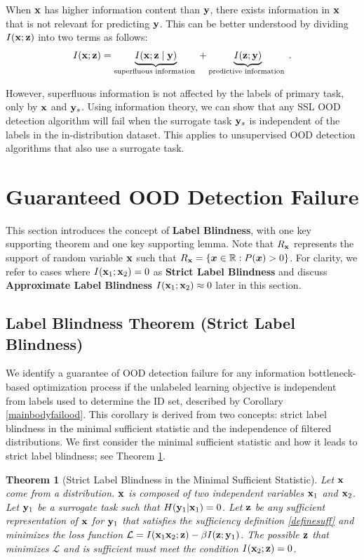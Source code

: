 \documentclass[11pt, oneside]{book}
\theoremstyle{plain}
\newtheorem{theorem}{Theorem}[section]
\theoremstyle{definition}
\theoremstyle{remark}
\begin{document}
When ${\mathbf{x}}$ has higher information content than ${\mathbf{y}}$, there exists information in ${\mathbf{x}}$ that is not relevant for predicting ${\mathbf{y}}$. This can be better understood by dividing $I({\mathbf{x}};{\mathbf{z}})$ into two terms \citep{federici2020learning} as follows:
\begin{align}
I({\mathbf{x}} ; {\mathbf{z}})=\underbrace{I({\mathbf{x}} ;{\mathbf{z}} \mid {\mathbf{y}})}_{\text {superfluous information }}+\underbrace{I({\mathbf{z}} ; {\mathbf{y}})}_{\text {predictive information }}. \label{superfluous}
\end{align}

However, superfluous information is not affected by the labels of primary task, only by ${\mathbf{x}}$ and ${\mathbf{y}}_{s}$. Using information theory, we can show that any SSL OOD detection algorithm will fail when the surrogate task ${\mathbf{y}}_{s}$ is independent of the labels in the in-distribution dataset. This applies to unsupervised OOD detection algorithms that also use a surrogate task.

\section{Guaranteed OOD Detection Failure}

This section introduces the concept of \textbf{Label Blindness}, with one key supporting theorem and one key supporting lemma. Note that $R_{{\mathbf{x}}}$ represents the support of random variable ${\mathbf{x}}$ such that $R_{{\mathbf{x}}} = \{{\bm{x}} \in \mathbb{R} : P({\bm{x}}) > 0\}$. For clarity, we refer to cases where $I({\mathbf{x}}_1; {\mathbf{x}}_2) = 0$ as \textbf{Strict Label Blindness} and discuss \textbf{Approximate Label Blindness} $I({\mathbf{x}}_1; {\mathbf{x}}_2) \approx 0$ later in this section.

\subsection{Label Blindness Theorem (Strict Label Blindness)}

We identify a guarantee of OOD detection failure for any information bottleneck-based optimization process if the unlabeled learning objective is independent from labels used to determine the ID set, described by Corollary \ref{mainbodyfailood}. This corollary is derived from two concepts: strict label blindness in the minimal sufficient statistic and the independence of filtered distributions. We first consider the minimal sufficient statistic and how it leads to strict label blindness; see Theorem \ref{mainbodygenloss}.

\begin{theorem}[Strict Label Blindness in the Minimal Sufficient Statistic]
    Let ${\mathbf{x}}$ come from a distribution. ${\mathbf{x}}$ is composed of two independent variables ${\mathbf{x}}_1$ and ${\mathbf{x}}_2$. Let ${\mathbf{y}}_1$ be a surrogate task such that $H({\mathbf{y}}_1|{\mathbf{x}}_1) = 0$. Let ${\mathbf{z}}$ be any sufficient representation of ${\mathbf{x}}$ for ${\mathbf{y}}_1$ that satisfies the sufficiency definition \ref{definesuff} and minimizes the loss function $\mathcal{L} = I({\mathbf{x}}_1 {\mathbf{x}}_2; {\mathbf{z}}) - \beta I({\mathbf{z}};{\mathbf{y}}_1)$. The possible ${\mathbf{z}}$ that minimizes $\mathcal{L}$ and is sufficient must meet the condition $I({\mathbf{x}}_2; {\mathbf{z}}) = 0$.
    \label{mainbodygenloss}
\end{theorem}
\end{document}
